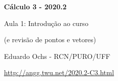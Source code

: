 \documentclass[oneside,12pt]{article}
\begin{document}


\long{}
\long{}
\long{}
\long{}
\long{}
\long{}
\long{}
\long{}
\long{}
\long{}

\long{}
\long{}

\def\frown{\ensuremath{{=}{(}}}
\def\True {\mathbf{V}}
\def\False{\mathbf{F}}

\def\drafturl{http://angg.twu.net/LATEX/2020-2-C3.pdf}
\def\drafturl{http://angg.twu.net/2020.2-C3.html}
\def\draftfooter{\tiny \href{\drafturl}{\jobname{}} \ColorBrown{\shorttoday{} \hours}}



%

\thispagestyle{empty}

\begin{center}

\vspace*{1.2cm}

{\bf \Large Cálculo 3 - 2020.2}

\bsk

Aula 1: Introdução ao curso

(e revisão de pontos e vetores)


\bsk

Eduardo Ochs - RCN/PURO/UFF

\url{http://angg.twu.net/2020.2-C3.html}

\end{center}
\end{document}
